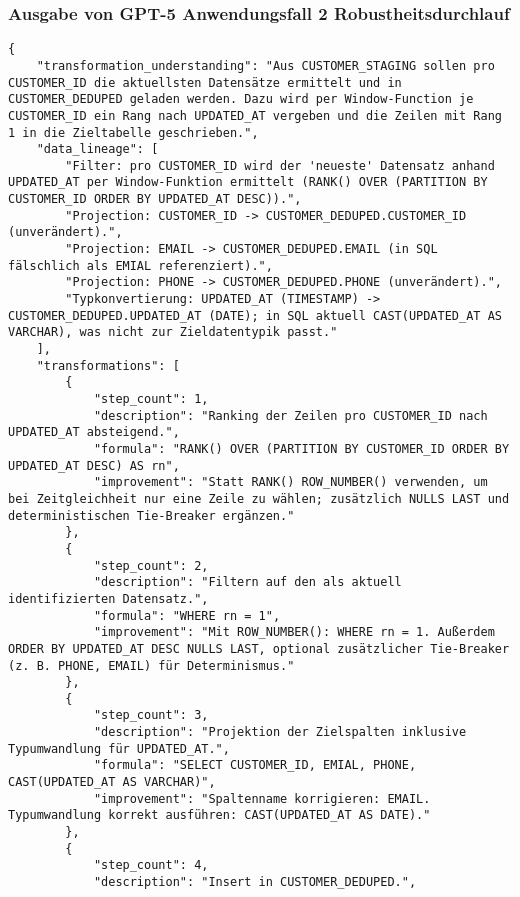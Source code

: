 \subsubsection{Ausgabe von GPT-5 Anwendungsfall 2 Robustheitsdurchlauf}\label{anhang:subsubsec:gpt_case2_prompt3}
\begin{lstlisting}[caption={Ausgabe: GPT-5 Anwendungsfall 2 Robustheitsdurchlauf},label={gpt_case2_prompt3}]
{
    "transformation_understanding": "Aus CUSTOMER_STAGING sollen pro CUSTOMER_ID die aktuellsten Datensätze ermittelt und in CUSTOMER_DEDUPED geladen werden. Dazu wird per Window-Function je CUSTOMER_ID ein Rang nach UPDATED_AT vergeben und die Zeilen mit Rang 1 in die Zieltabelle geschrieben.",
    "data_lineage": [
        "Filter: pro CUSTOMER_ID wird der 'neueste' Datensatz anhand UPDATED_AT per Window-Funktion ermittelt (RANK() OVER (PARTITION BY CUSTOMER_ID ORDER BY UPDATED_AT DESC)).",
        "Projection: CUSTOMER_ID -> CUSTOMER_DEDUPED.CUSTOMER_ID (unverändert).",
        "Projection: EMAIL -> CUSTOMER_DEDUPED.EMAIL (in SQL fälschlich als EMIAL referenziert).",
        "Projection: PHONE -> CUSTOMER_DEDUPED.PHONE (unverändert).",
        "Typkonvertierung: UPDATED_AT (TIMESTAMP) -> CUSTOMER_DEDUPED.UPDATED_AT (DATE); in SQL aktuell CAST(UPDATED_AT AS VARCHAR), was nicht zur Zieldatentypik passt."
    ],
    "transformations": [
        {
            "step_count": 1,
            "description": "Ranking der Zeilen pro CUSTOMER_ID nach UPDATED_AT absteigend.",
            "formula": "RANK() OVER (PARTITION BY CUSTOMER_ID ORDER BY UPDATED_AT DESC) AS rn",
            "improvement": "Statt RANK() ROW_NUMBER() verwenden, um bei Zeitgleichheit nur eine Zeile zu wählen; zusätzlich NULLS LAST und deterministischen Tie-Breaker ergänzen."
        },
        {
            "step_count": 2,
            "description": "Filtern auf den als aktuell identifizierten Datensatz.",
            "formula": "WHERE rn = 1",
            "improvement": "Mit ROW_NUMBER(): WHERE rn = 1. Außerdem ORDER BY UPDATED_AT DESC NULLS LAST, optional zusätzlicher Tie-Breaker (z. B. PHONE, EMAIL) für Determinismus."
        },
        {
            "step_count": 3,
            "description": "Projektion der Zielspalten inklusive Typumwandlung für UPDATED_AT.",
            "formula": "SELECT CUSTOMER_ID, EMIAL, PHONE, CAST(UPDATED_AT AS VARCHAR)",
            "improvement": "Spaltenname korrigieren: EMAIL. Typumwandlung korrekt ausführen: CAST(UPDATED_AT AS DATE)."
        },
        {
            "step_count": 4,
            "description": "Insert in CUSTOMER_DEDUPED.",

\end{lstlisting}
